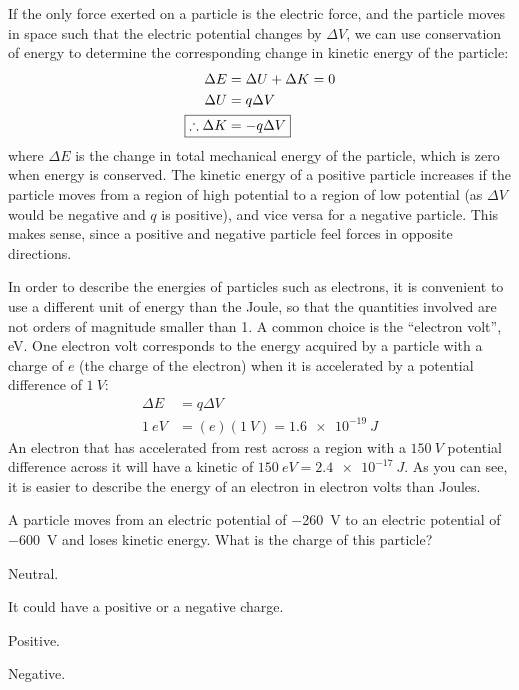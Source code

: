 If the only force exerted on a particle is the electric force, and the particle moves in space such that the electric potential changes by $\Delta V$, we can use conservation of energy to determine the corresponding change in kinetic energy of the particle:
\begin{align*}
\Delta E &= \Delta U + \Delta K = 0\\
\Delta U &= q\Delta V\\
\Aboxed{\therefore \Delta K &= -q \Delta V}
\end{align*}
where $\Delta E$ is the change in total mechanical energy of the particle, which is zero when energy is conserved. The kinetic energy of a positive particle increases if the particle moves from a region of high potential to a region of low potential (as $\Delta V$ would be negative and $q$ is positive), and vice versa for a negative particle. This makes sense, since a positive and negative particle feel forces in opposite directions.

In order to describe the energies of particles such as electrons, it is convenient to use a different unit of energy than the Joule, so that the quantities involved are not orders of magnitude smaller than 1. A common choice is the ``electron volt'', \si{eV}. One electron volt corresponds to the energy acquired by a particle with a charge of $e$ (the charge of the electron) when it is accelerated by a potential difference of $\SI{1}{V}$:
\begin{align*}
\Delta E &= q\Delta V\\
\SI{1}{eV}&=(e)(\SI{1}{V})=\SI{1.6e-19}{J}
\end{align*}
An electron that has accelerated from rest across a region with a $\SI{150}{V}$ potential difference across it will have a kinetic of $\SI{150}{eV}=\SI{2.4e-17}{J}$. As you can see, it is easier to describe the energy of an electron in electron volts than Joules.

\begin{checkpoint}
	\begin{MCquestion}{A particle moves from an electric potential of \SI{-260}{V} to an electric potential of \SI{-600}{V} and loses kinetic energy. What is the charge of this particle?}
	\item Neutral.
	\item It could have a positive or a negative charge.
	\item Positive.
	\item Negative. \correct
\end{MCquestion}
\end{checkpoint}

